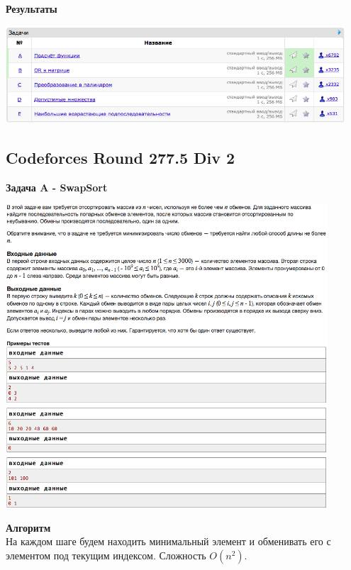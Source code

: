 \documentclass[a4paper,12pt]{article}
\begin{document}
\textbf{{\large Результаты}} \\
\begin{center}
\includegraphics[width=0.95\textwidth]{C_277/A_C_277_result.png}\\ [1cm]
\end{center}


%
%

\newpage
\subsection{Codeforces Round 277.5 Div 2}

\textbf{{\large Задача A - SwapSort}} \\
\begin{center}
\includegraphics[width=0.9\textwidth]{C_277_5/C_277_5_A.png}\\ [1cm]
\end{center}
\textbf{{\large Алгоритм}} \\
На каждом шаге будем находить минимальный элемент и обменивать его с элементом под текущим индексом. Сложность $O(n^2)$. \\
\end{document}
